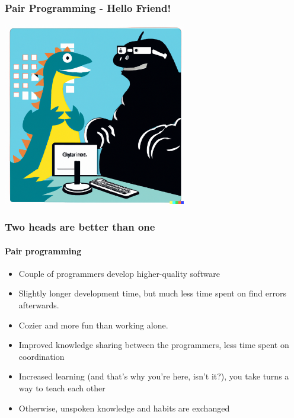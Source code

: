 \documentclass[10pt]{beamer}
\begin{document}




\begin{frame}
   \frametitle{Pair Programming - Hello Friend!}
   	 \includegraphics[height=8cm]{images/pairprog}
\end{frame}


\begin{frame}
   \frametitle{Two heads are better than one}
   \framesubtitle{Pair programming}

  \begin{itemize}
   \item Couple of programmers develop higher-quality software
   \item Slightly longer development time, but much less time spent on
     find errors afterwards.
   \item Cozier and more fun than working alone.
   \item Improved knowledge sharing between the programmers, less time spent
     on coordination %
   \item Increased learning (and that's why you're here, isn't it?), you take turns
     a way to teach each other
   \item Otherwise, unspoken knowledge and habits are exchanged
   \end{itemize}
\end{frame}
\end{document}
